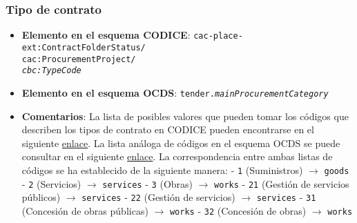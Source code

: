         \subsubsection{Tipo de contrato}
            \begin{itemize}
                \item \textbf{Elemento en el esquema CODICE}:
                    \tabto{7.6cm} \texttt{cac-place-ext:ContractFolderStatus/} \\
                    \tabto{7.6cm} \texttt{cac:ProcurementProject/} \\
                    \tabto{7.6cm} \texttt{\textit{cbc:TypeCode}}
                \item \textbf{Elemento en el esquema OCDS}:
                    \tabto{7.6cm} \texttt{tender.\textit{mainProcurementCategory}}
                \item \textbf{Comentarios}: La lista de posibles valores que pueden tomar los códigos que describen los tipos de contrato en CODICE pueden encontrarse en el siguiente \href{https://contrataciondelestado.es/codice/cl/2.08/ContractCode-2.08.gc}{enlace}. La lista análoga de códigos en el esquema OCDS se puede consultar en el siguiente \href{https://standard.open-contracting.org/latest/es/schema/codelists/#procurement-category}{enlace}. La correspondencia entre ambas listas de códigos se ha establecido de la siguiente manera:
                        \subitem - \texttt{1} (Suministros) $\rightarrow$ \texttt{goods}
                        \subitem - \texttt{2} (Servicios) $\rightarrow$ \texttt{services}
                        \subitem - \texttt{3} (Obras) $\rightarrow$ \texttt{works}
                        \subitem - \texttt{21} (Gestión de servicios públicos) $\rightarrow$ \texttt{services}
                        \subitem - \texttt{22} (Gestión de servicios) $\rightarrow$ \texttt{services}
                        \subitem - \texttt{31} (Concesión de obras públicas) $\rightarrow$ \texttt{works}
                        \subitem - \texttt{32} (Concesión de obras) $\rightarrow$ \texttt{works}
            \end{itemize}
        
